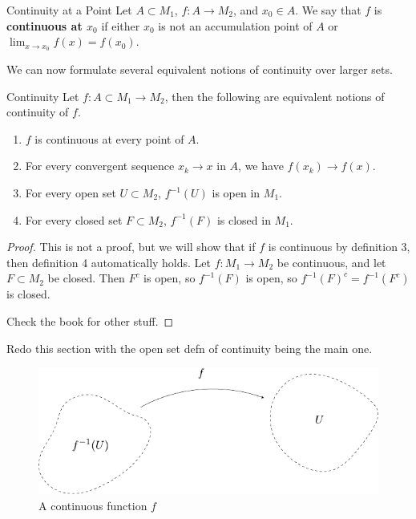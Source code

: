 \documentclass[10pt]{report}
\begin{document}
\begin{defn}{Continuity at a Point}{}
	Let $A \subset M_1$, $f:A \to M_2$, and $x_0 \in A$. We say that $f$ is \textbf{continuous at $x_0$} if either $x_0$ is not an accumulation point of $A$ or $\lim_{x \to x_0} f(x)=f(x_0)$.
\end{defn}

We can now formulate several equivalent notions of continuity over larger sets.
\begin{thrm}{Continuity}{}
	Let $f:A \subset M_1 \to M_2$, then the following are equivalent notions of continuity of $f$.
\begin{enumerate}
	\item $f$ is continuous at every point of $A$.
	\item For every convergent sequence $x_k \to x$ in $A$, we have $f(x_k) \to f(x)$.
	\item For every open set $U \subset M_2$, $f^{-1}(U)$ is open in $M_1$.
	\item For every closed set $F \subset M_2$, $f^{-1}(F)$ is closed in $M_1$.
\end{enumerate}
\end{thrm}
\begin{proof}
	This is not a proof, but we will show that if $f$ is continuous by definition 3, then definition 4 automatically holds. Let $f:M_1\to M_2$ be continuous, and let $F \subset M_2$ be closed. Then $F^c$ is open, so $f^{-1}(F)$ is open, so $f^{-1}(F)^c = f^{-1}(F^c)$ is closed. 

	{\color{red}Check the book for other stuff.}
\end{proof}

{\color{red}Redo this section with the open set defn of continuity being the main one.}

\begin{figure}[H]
	\centering
	\includegraphics[scale=1]{fig/cts.pdf}
	\caption{A continuous function $f$}
\end{figure}
\end{document}
